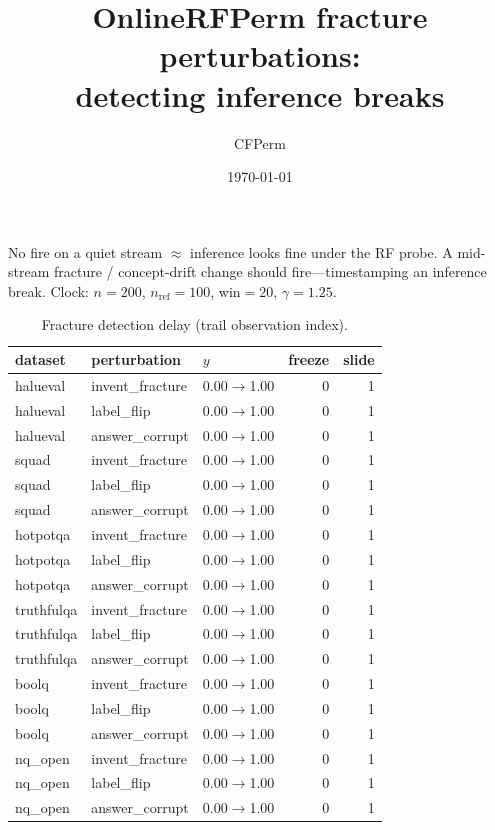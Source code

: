 \documentclass[11pt]{article}
\title{OnlineRFPerm fracture perturbations:\\detecting inference breaks}
\author{CFPerm}
\date{\today}
\begin{document}
\maketitle
No fire on a quiet stream $\approx$ inference looks fine under the RF probe. A mid-stream fracture / concept-drift change should fire---timestamping an inference break.
Clock: $n=200$, $n_{\mathrm{ref}}=100$, win$=20$, $\gamma=1.25$.
\begin{table}[h]\centering
\caption{Fracture detection delay (trail observation index).}
\begin{tabular}{lllrr}
\toprule dataset & perturbation & $y$ & freeze & slide \\
\midrule
halueval & invent\_fracture & 0.00$\to$1.00 & 0 & 1 \\
halueval & label\_flip & 0.00$\to$1.00 & 0 & 1 \\
halueval & answer\_corrupt & 0.00$\to$1.00 & 0 & 1 \\
squad & invent\_fracture & 0.00$\to$1.00 & 0 & 1 \\
squad & label\_flip & 0.00$\to$1.00 & 0 & 1 \\
squad & answer\_corrupt & 0.00$\to$1.00 & 0 & 1 \\
hotpotqa & invent\_fracture & 0.00$\to$1.00 & 0 & 1 \\
hotpotqa & label\_flip & 0.00$\to$1.00 & 0 & 1 \\
hotpotqa & answer\_corrupt & 0.00$\to$1.00 & 0 & 1 \\
truthfulqa & invent\_fracture & 0.00$\to$1.00 & 0 & 1 \\
truthfulqa & label\_flip & 0.00$\to$1.00 & 0 & 1 \\
truthfulqa & answer\_corrupt & 0.00$\to$1.00 & 0 & 1 \\
boolq & invent\_fracture & 0.00$\to$1.00 & 0 & 1 \\
boolq & label\_flip & 0.00$\to$1.00 & 0 & 1 \\
boolq & answer\_corrupt & 0.00$\to$1.00 & 0 & 1 \\
nq_open & invent\_fracture & 0.00$\to$1.00 & 0 & 1 \\
nq_open & label\_flip & 0.00$\to$1.00 & 0 & 1 \\
nq_open & answer\_corrupt & 0.00$\to$1.00 & 0 & 1 \\
\bottomrule\end{tabular}\end{table}
\end{document}
